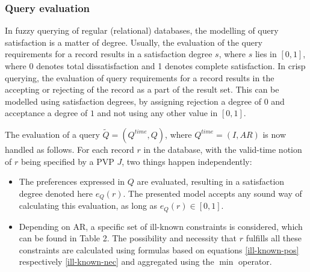 \subsubsection{Query evaluation}
In fuzzy querying of regular (relational) databases, the modelling of query satisfaction is a matter of degree. Usually, the evaluation of the query requirements for a record results in a satisfaction degree $s$, where $s$ lies in $\left[0,1\right]$, where 0 denotes total dissatisfaction and 1 denotes complete satisfaction. In crisp querying, the evaluation of query requirements for a record results in the accepting or rejecting of the record as a part of the result set. This can be modelled using satisfaction degrees, by assigning rejection a degree of $0$ and acceptance a degree of $1$ and not using any other value in $\left[0,1\right]$.

The evaluation of a query $\tilde{Q} = \left( Q^{time}, Q \right)$, where $Q^{time} = \left( I, AR \right)$ is now handled as follows. For each record $r$ in the database, with the valid-time notion of $r$ being specified by a PVP $J$, two things happen independently:



\begin{itemize}
\item
The preferences expressed in $Q$ are evaluated, resulting in a satisfaction degree denoted here $e_{Q}(r)$. The presented model accepts any sound way of calculating this evaluation, as long as $e_{Q}(r) \in \left[0,1\right]$. 
\item
Depending on AR, a specific set of ill-known constraints is considered, which can be found in Table 2. The possibility and necessity that $r$ fulfills all these constraints are calculated using formulas based on equations \eqref{ill-known-pos} respectively \eqref{ill-known-nec} and aggregated using the $\min$ operator. 


\end{itemize}


